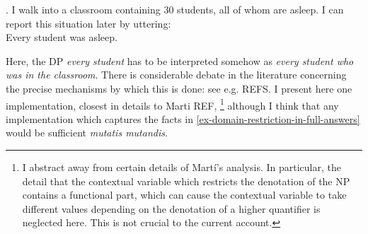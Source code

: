\documentclass[doublespace]{umthesis}
\begin{document}
\ex. 	I walk into a classroom containing 30 students, all of whom are asleep. I can report this situation later by uttering:\\
	Every student was asleep.
	
Here, the DP {\it every student} has to be interpreted somehow as {\it every student who was in the classroom}.
There is considerable debate in the literature concerning the precise mechanisms by which this is done: see e.g. REFS. %
I present here one implementation, closest in details to Marti REF, %
\footnote{I abstract away from certain details of Mart\'i's analysis.
In particular, the detail that the contextual variable which restricts the denotation of the NP contains a functional part, which can cause the contextual variable to take different values depending on the denotation of a higher quantifier %
is neglected here.
This is not crucial to the current account.}
although I think that any implementation which captures the facts in \ref{ex-domain-restriction-in-full-answers} would be sufficient {\it mutatis mutandis}. 




\end{document}
